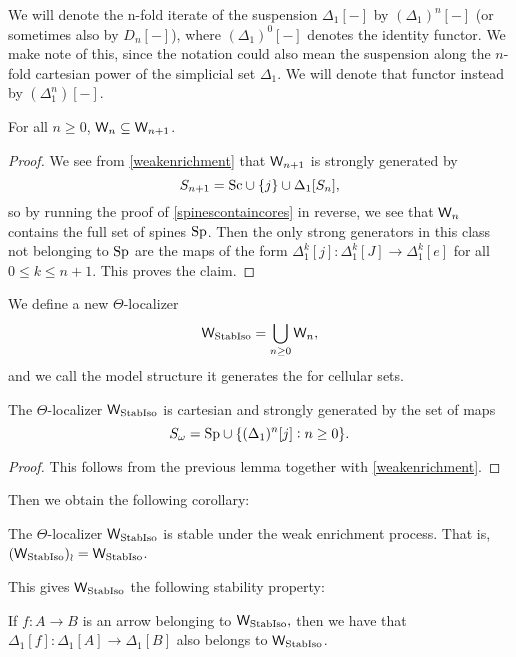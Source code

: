 \begin{note}We will denote the n-fold iterate of the suspension \(\Delta_1[-]\) by \((\Delta_1)^n[-]\) (or sometimes also by \(D_n[-]\)), where \((\Delta_1)^0[-]\) denotes the identity functor.  We make note of this, since the notation could also mean the suspension along the \(n\)-fold cartesian power of the simplicial set \(\Delta_1\).  We will denote that functor instead by \((\Delta_1^n)[-]\).
\end{note}
\begin{lemma} For all \(n\geq 0\), \(\mathsf{W}_n\subseteq \mathsf{W}_{n+1}\).  
\end{lemma}
\begin{proof}We see from \eqref{weakenrichment} that \(\mathsf{W}_{n+1}\) is strongly generated by \[S_{n+1}={\operatorname{Sc}} \cup \{j\} \cup \Delta_1[S_n],\] so by running the proof of \eqref{spinescontaincores} in reverse, we see that \(\mathsf{W}_n\) contains the full set of spines \({\operatorname{Sp}}\).  Then the only strong generators in this class not belonging to \({\operatorname{Sp}}\) are the maps of the form \(\Delta_1^k[j]:\Delta_1^k[J]\to \Delta_1^k[e]\) for all \(0\leq k\leq n+1\).  This proves the claim.
\end{proof}
\begin{defn}We define a new \(\Theta\)-localizer \[\mathsf{W}_{\operatorname{StabIso}}=\bigcup_{n\geq 0} \mathsf{W}_n,\] and we call the model structure it generates the  for cellular sets.  
\end{defn}
\begin{prop} The \(\Theta\)-localizer \(\mathsf{W}_{\operatorname{StabIso}}\) is cartesian and strongly generated by the set of maps \[S_\omega={\operatorname{Sp}}\cup \{(\Delta_1)^n[j]:n\geq 0\}.\]
\end{prop}
\begin{proof} This follows from the previous lemma together with \eqref{weakenrichment}.
\end{proof}
Then we obtain the following corollary:
\begin{cor} The \(\Theta\)-localizer \(\mathsf{W}_{\operatorname{StabIso}}\) is stable under the weak enrichment process.  That is, \((\mathsf{W}_{\operatorname{StabIso}})_\wr=\mathsf{W}_{\operatorname{StabIso}}\).
\end{cor}
This gives \(\mathsf{W}_{\operatorname{StabIso}}\) the following stability property:
\begin{prop}If \(f:A\to B\) is an arrow belonging to \(\mathsf{W}_{\operatorname{StabIso}},\) then we have that \(\Delta_1[f]:\Delta_1[A]\to \Delta_1[B]\) also belongs to \(\mathsf{W}_{\operatorname{StabIso}}\).  
\end{prop}
